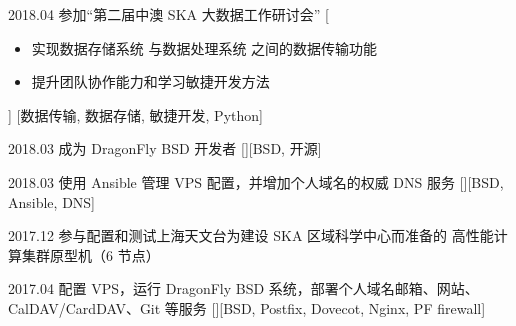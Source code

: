 \documentclass[zh]{resume}
\begin{document}
\begin{experiences}
  \experience
    {2018.04}%
    {参加\enquote{第二届中澳 SKA 大数据工作研讨会}}%
    [\begin{itemize}
      \item 实现数据存储系统
            与数据处理系统
            之间的数据传输功能
      \item 提升团队协作能力和学习敏捷开发方法
    \end{itemize}]%
    [数据传输, 数据存储, 敏捷开发, Python]

  \separator{0.5em}
  \experience
    {2018.03}%
    {成为 DragonFly BSD 开发者}%
    [][BSD, 开源]

  \separator{0.5em}
  \experience
    {2018.03}%
    {使用 Ansible 管理 VPS 配置，并增加个人域名的权威 DNS 服务}%
    [][BSD, Ansible, DNS]


  \separator{0.5em}
  \experience
    {2017.12}%
    {参与配置和测试上海天文台为建设 SKA 区域科学中心而准备的
      高性能计算集群原型机（6 节点）}



  \separator{0.5em}
  \experience
    {2017.04}%
    {配置 VPS，运行 DragonFly BSD 系统，部署个人域名邮箱、网站、
      CalDAV/CardDAV、Git 等服务}%
    [][BSD, Postfix, Dovecot, Nginx, PF firewall]


\end{experiences}
\end{document}
